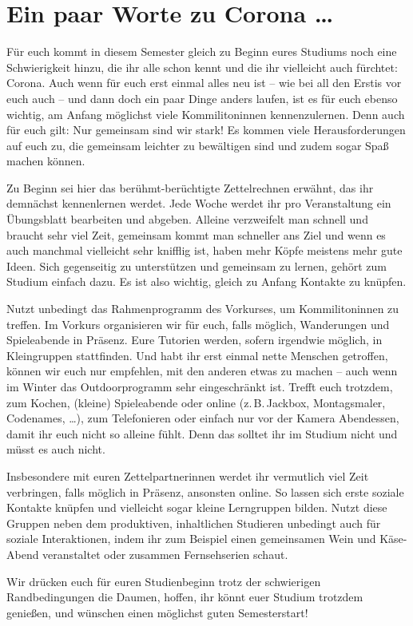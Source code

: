 \section{Ein paar Worte zu Corona \ldots}

Für euch kommt in diesem Semester gleich zu Beginn eures Studiums noch eine Schwierigkeit hinzu, die ihr alle schon kennt und die ihr vielleicht auch fürchtet: Corona.
Auch wenn für euch erst einmal alles neu ist -- wie bei all den Erstis vor euch auch -- und dann doch ein paar Dinge  anders laufen, ist es für euch ebenso wichtig, am Anfang möglichst viele Kommilitoninnen kennenzulernen. Denn auch für euch gilt: Nur gemeinsam sind wir stark! Es kommen viele Herausforderungen auf euch zu, die gemeinsam leichter zu bewältigen sind und zudem sogar Spaß machen können.

Zu Beginn sei hier das berühmt-berüchtigte Zettelrechnen erwähnt, das ihr demnächst kennenlernen werdet. Jede Woche werdet ihr pro Veranstaltung ein Übungsblatt bearbeiten und abgeben. Alleine verzweifelt man schnell und braucht sehr viel Zeit, gemeinsam kommt man schneller ans Ziel und wenn es auch manchmal vielleicht sehr knifflig ist, haben mehr Köpfe meistens mehr gute Ideen. Sich gegenseitig zu unterstützen und gemeinsam zu lernen, gehört zum Studium einfach dazu. Es ist also wichtig, gleich zu Anfang Kontakte zu knüpfen.

Nutzt unbedingt das Rahmenprogramm des Vorkurses, um Kommilitoninnen zu treffen.  Im Vorkurs organisieren wir für euch, falls möglich, Wanderungen und Spieleabende in Präsenz.
Eure Tutorien werden, sofern irgendwie möglich, in Kleingruppen stattfinden.
Und habt ihr erst einmal nette Menschen getroffen, können wir euch nur empfehlen, mit den anderen etwas zu machen -- auch wenn im Winter das Outdoorprogramm sehr eingeschränkt ist. Trefft euch trotzdem, zum Kochen, (kleine) Spieleabende oder online (z.\,B.\,Jackbox, Montagsmaler, Codenames, \ldots), zum Telefonieren oder einfach nur vor der Kamera Abendessen, damit ihr euch nicht so alleine fühlt. Denn das solltet ihr im Studium nicht und müsst es auch nicht.

Insbesondere mit euren Zettelpartnerinnen werdet ihr vermutlich viel Zeit verbringen, falls möglich in Präsenz, ansonsten online. So lassen sich erste soziale Kontakte knüpfen und vielleicht sogar kleine Lerngruppen bilden. Nutzt diese Gruppen neben dem produktiven, inhaltlichen Studieren unbedingt auch für soziale Interaktionen, indem ihr zum Beispiel einen gemeinsamen Wein und Käse-Abend veranstaltet oder zusammen Fernsehserien schaut.

Wir drücken euch für euren Studienbeginn trotz der schwierigen Randbedingungen die Daumen, hoffen, ihr könnt euer Studium trotzdem genießen, und wünschen einen möglichst guten Semesterstart!
